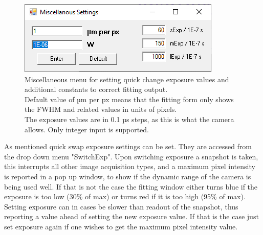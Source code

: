 \documentclass[twoside,openright]{scrreprt}
\begin{document}
\begin{figure}[hbtp]
\centering
\includegraphics[scale=1]{images/ArtrayExamplePics/DefaultMiscSettings.PNG}
\caption{Miscellaneous menu for setting quick change exposure values and additional constants to correct fitting output.\\
Default value of µm per px means that the fitting form only shows the FWHM and related values in units of pixels.\\
The exposure values are in 0.1 µs steps, as this is what the camera allows. Only integer input is supported.\label{LiveFitting:MiscMenu}}
\end{figure}



As mentioned quick swap exposure settings can be set. They are accessed from the drop down menu "SwitchExp". Upon switching exposure a snapshot is taken, this interrupts all other image acquisition types, and a maximum pixel intensity is reported in a pop up window, to show if the dynamic range of the camera is being used well. If that is not the case the fitting window either turns blue if the exposure is too low (30\% of max) or turns red if it is too high (95\% of max). Setting exposure can in cases be slower than readout of the snapshot, thus reporting a value ahead of setting the new exposure value. If that is the case just set exposure again if one wishes to get the maximum pixel intensity value.\\
\end{document}
